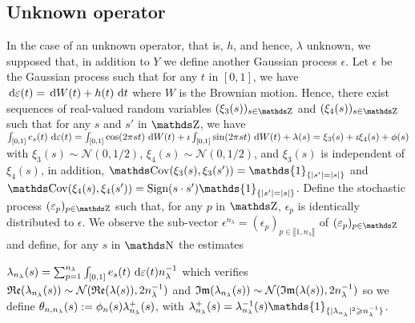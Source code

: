 \subsection{Unknown operator}
In the case of an unknown operator, that is, $h$, and hence, $\lambda$ unknown, we supposed that, in addition to $Y$ we define another Gaussian process $\epsilon$.
Let $\epsilon$ be the Gaussian process such that for any $t$ in $[0, 1]$, we have $\operatorname{\, d \!} \varepsilon(t) = \operatorname{\, d \!} W(t) + h(t) \operatorname{\, d \!} t$ where $W$ is the Brownian motion.
Hence, there exist sequences of real-valued random variables $(\xi_{3}(s))_{s \in \Z}$ and $(\xi_{4}(s))_{s \in \Z}$ such that for any $s$ and $s'$ in $\Z$, we have $\int_{[0, 1]} e_{s}(t) \operatorname{\, d \!} \varepsilon(t) = \int_{[0, 1]} \cos(2 \pi s t) \operatorname{\, d \!} W(t) + \imath \int_{[0, 1]} \sin(2 \pi s t) \operatorname{\, d \!} W(t) + \lambda(s) = \xi_{3}(s) + \imath \xi_{4}(s) + \phi(s)$ with $\xi_{3}(s) \sim \mathcal{N}(0, 1/2)$, $\xi_{4}(s) \sim \mathcal{N}(0, 1/2)$, and $\xi_{3}(s)$ is independent of $\xi_{4}(s)$, in addition, $\Cov(\xi_{3}(s), \xi_{3}(s')) = \mathds{1}_{\{\vert s' \vert = \vert s \vert\}}$ and $\Cov(\xi_{4}(s), \xi_{4}(s')) = \text{Sign}(s \cdot s') \mathds{1}_{\{\vert s' \vert = \vert s \vert\}}$.
Define the \iid stochastic process $(\epsilon_{p})_{p \in \Z}$ such that, for any $p$ in $\Z$, $\epsilon_{p}$ is identically distributed to $\epsilon$.
We observe the sub-vector $\epsilon^{n_{\lambda}} = (\epsilon_{p})_{p \in \llbracket 1, n_{\lambda} \rrbracket}$ of $(\epsilon_{p})_{p \in \Z}$ and define, for any $s$ in $\N$ the estimates

$\lambda_{n_{\lambda}}(s) = \sum_{p = 1}^{n_{\lambda}} \int_{[0, 1]} e_{s}(t) \operatorname{\, d \!} \varepsilon(t) n_{\lambda}^{-1}$ which verifies $\operatorname{\mathfrak{Re}}(\lambda_{n_{\lambda}}(s)) \sim \mathcal{N}(\operatorname{\mathfrak{Re}}(\lambda(s)), 2n_{\lambda}^{-1})$ and $\operatorname{\mathfrak{Im}}(\lambda_{n_{\lambda}}(s)) \sim \mathcal{N}(\operatorname{\mathfrak{Im}}(\lambda(s)), 2 n_{\lambda}^{-1})$ so we define $\theta_{n, n_{\lambda}}(s) := \phi_{n}(s) \lambda_{n_{\lambda}}^{+}(s)$, with $\lambda_{\ssE}^{+}(s) = \lambda_{\ssE}^{-1}(s) \mathds{1}_{\{\vert \lambda_{\ssE}\vert^{2} \geq \ssE^{-1}\}}$.

